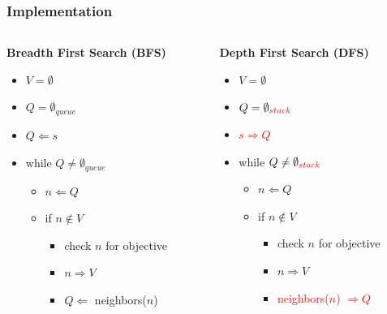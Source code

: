 \documentclass[xcolor={dvipsnames}]{beamer}
\begin{document}
\frame
{
\frametitle{Implementation}



\begin{columns}
\begin{column}{.5\textwidth}

\textbf{Breadth First Search (BFS)}

\Large
\begin{itemize}
\item<2-> $V = \emptyset$
\item<2-> $Q = \emptyset_{queue}$
\item<2-> $Q \Leftarrow s$ 
\item<3-> while $Q \not = \emptyset_{queue}$ 
\begin{itemize}
\large
\item<4-> $n \Leftarrow Q$ 
\item<4-> if $n \not \in V$
\begin{itemize}
\footnotesize
\item<5->  check $n$ for objective
\item<6-> $n \Rightarrow V$ 
\item<7-> $Q \Leftarrow$ neighbors($n$)
\end{itemize}
\end{itemize}
\end{itemize}

\end{column}
\begin{column}{.5\textwidth}

\textbf{Depth First Search (DFS)}

\Large
\begin{itemize}
\item<8-> $V = \emptyset$
\item<8-> $Q = \emptyset_{\textcolor{red}{stack}}$
\item<8-> \textcolor{red}{$s \Rightarrow Q$} 
\item<8-> while $Q \not = \emptyset_{\textcolor{red}{stack}}$ 
\begin{itemize}
\large
\item<8-> $n \Leftarrow Q$ 
\item<8-> if $n \not \in V$
\begin{itemize}
\footnotesize
\item<8-> check $n$ for objective
\item<8-> $n \Rightarrow V$ 
\item<8-> \textcolor{red}{neighbors($n$) $\Rightarrow Q$} 
\end{itemize}
\end{itemize}
\end{itemize}


\end{column}
\end{columns}}
\end{document}
